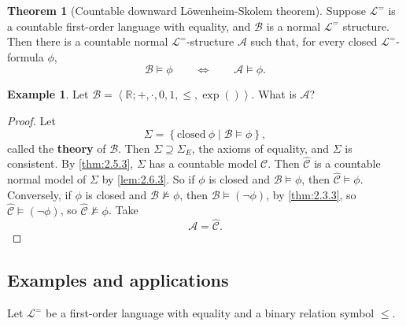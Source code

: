 \documentclass{article}
\newcommand{\R}{\mathbb{R}}
\newcommand{\A}{\mathcal{A}}
\newcommand{\B}{\mathcal{B}}
\renewcommand{\L}{\mathcal{L}}
\newcommand{\rb}[1]{\left( #1 \right)}
\newcommand{\cb}[1]{\left\{ #1 \right\}}
\newcommand{\ab}[1]{\left\langle #1 \right\rangle}
\newcommand{\notb}[1]{\rb{\neg #1}}
\theoremstyle{definition}\newtheorem{definition}{Definition}[subsection]
\theoremstyle{definition}\newtheorem{remark1}[definition]{Remark}
\theoremstyle{definition}\newtheorem{example1}[definition]{Example}
\theoremstyle{definition}\newtheorem*{remark2}{Remark}
\theoremstyle{definition}\newtheorem*{example2}{Example}
\theoremstyle{definition}\newtheorem*{note}{Note}
\theoremstyle{definition}\newtheorem*{notation}{Notation}
\newtheorem{theorem}[definition]{Theorem}
\begin{document}
\begin{theorem}[Countable downward L\"owenheim-Skolem theorem]
\label{thm:2.6.6}
Suppose $ \L^= $ is a countable first-order language with equality, and $ \B $ is a normal $ \L^= $ structure. Then there is a countable normal $ \L^= $-structure $ \A $ such that, for every closed $ \L^= $-formula $ \phi $,
$$ \B \vDash \phi \qquad \iff \qquad \A \vDash \phi. $$
\end{theorem}

\begin{example2}
Let $ \B = \ab{\R; +, \cdot, 0, 1, \le, \exp\rb{}} $. What is $ \A $?
\end{example2}

\begin{proof}
Let
$$ \Sigma = \cb{\text{closed} \ \phi \mid \B \vDash \phi}, $$
called the \textbf{theory} of $ \B $. Then $ \Sigma \supseteq \Sigma_E $, the axioms of equality, and $ \Sigma $ is consistent. By \ref{thm:2.5.3}, $ \Sigma $ has a countable model $ \mathcal{C} $. Then $ \widehat{\mathcal{C}} $ is a countable normal model of $ \Sigma $ by \ref{lem:2.6.3}. So if $ \phi $ is closed and $ \B \vDash \phi $, then $ \widehat{\mathcal{C}} \vDash \phi $. Conversely, if $ \phi $ is closed and $ \B \not\vDash \phi $, then $ \B \vDash \notb{\phi} $, by \ref{thm:2.3.3}, so $ \widehat{\mathcal{C}} \vDash \notb{\phi} $, so $ \widehat{\mathcal{C}} \not\vDash \phi $. Take
$$ \A = \widehat{\mathcal{C}}. $$
\end{proof}

\subsection{Examples and applications}

Let $ \L^= $ be a first-order language with equality and a binary relation symbol $ \le $.
\end{document}
